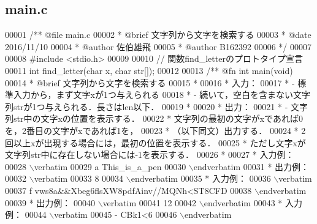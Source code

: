 \subsection{main.\-c}

\begin{DoxyCode}
00001 \textcolor{comment}{/**  @file main.c}
00002 \textcolor{comment}{ *   @brief  文字列から文字を検索する}
00003 \textcolor{comment}{ *   @date   2016/11/10}
00004 \textcolor{comment}{ *   @author 佐伯雄飛}
00005 \textcolor{comment}{ *   @author B162392}
00006 \textcolor{comment}{ */}
00007 
00008 \textcolor{preprocessor}{#include <stdio.h>}
00009 
00010 \textcolor{comment}{// 関数find\_letterのプロトタイプ宣言}
00011 \textcolor{keywordtype}{int} find_letter(\textcolor{keywordtype}{char} x, \textcolor{keywordtype}{char} str[]);
00012 \textcolor{comment}{}
00013 \textcolor{comment}{/** @fn int main(void)}
00014 \textcolor{comment}{ *  @brief 文字列から文字を検索する}
00015 \textcolor{comment}{ *}
00016 \textcolor{comment}{ *  入力：}
00017 \textcolor{comment}{ *  - 標準入力から，まず文字xが1つ与えられる}
00018 \textcolor{comment}{ *  - 続いて，空白を含まない文字列strが1つ与えられる．長さはlen以下．}
00019 \textcolor{comment}{ *}
00020 \textcolor{comment}{ *  出力：}
00021 \textcolor{comment}{ *  - 文字列str中の文字xの位置を表示する．}
00022 \textcolor{comment}{ *    文字列の最初の文字がxであれば0を，2番目の文字がxであれば1を，}
00023 \textcolor{comment}{ *    （以下同文）出力する．}
00024 \textcolor{comment}{ *    2回以上xが出現する場合には，最初の位置を表示する．}
00025 \textcolor{comment}{ *    ただし文字xが文字列str中に存在しない場合には-1を表示する．}
00026 \textcolor{comment}{ *}
00027 \textcolor{comment}{ *  入力例：}
00028 \textcolor{comment}{\(\backslash\)verbatim}
00029 \textcolor{comment}{a This\_is\_a\_pen}
00030 \textcolor{comment}{\(\backslash\)endverbatim}
00031 \textcolor{comment}{  *  出力例：}
00032 \textcolor{comment}{\(\backslash\)verbatim}
00033 \textcolor{comment}{8}
00034 \textcolor{comment}{\(\backslash\)endverbatim}
00035 \textcolor{comment}{ *  入力例：}
00036 \textcolor{comment}{\(\backslash\)verbatim}
00037 \textcolor{comment}{f vws8a&&Xbeg6flsXW8pdfAinv//MQNh<ST8CFD}
00038 \textcolor{comment}{\(\backslash\)endverbatim}
00039 \textcolor{comment}{  *  出力例：}
00040 \textcolor{comment}{\(\backslash\)verbatim}
00041 \textcolor{comment}{12}
00042 \textcolor{comment}{\(\backslash\)endverbatim}
00043 \textcolor{comment}{  *  入力例：}
00044 \textcolor{comment}{\(\backslash\)verbatim}
00045 \textcolor{comment}{- CBk1<6}
00046 \textcolor{comment}{\(\backslash\)endverbatim}

\end{DoxyCode}
